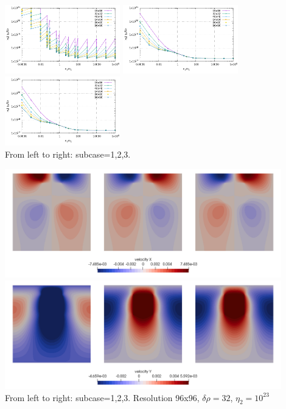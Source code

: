 \begin{center}
\includegraphics[width=5cm]{python_codes/fieldstone_22/results/case3/fallingblock_sub1.pdf}
\includegraphics[width=5cm]{python_codes/fieldstone_22/results/case3/fallingblock_sub2.pdf}
\includegraphics[width=5cm]{python_codes/fieldstone_22/results/case3/fallingblock_sub3.pdf}\\
{\captionfont From left to right: subcase=1,2,3.}
\end{center}

\begin{center}
\includegraphics[width=12cm]{python_codes/fieldstone_22/results/case3/u123}
\includegraphics[width=12cm]{python_codes/fieldstone_22/results/case3/v123}\\
{\captionfont From left to right: subcase=1,2,3. 
Resolution 96x96, $\delta \rho=32$, $\eta_2=10^{23}$}
\end{center}





